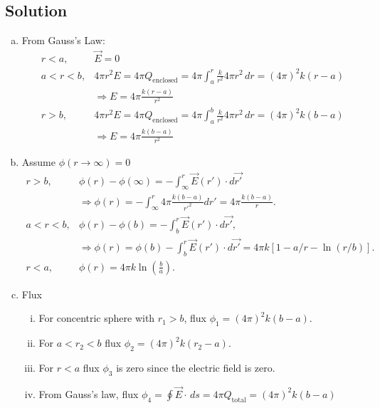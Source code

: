\documentclass[solutions]{esg8022pset}
\begin{document}
\subsection{Solution}
  \begin{enumerate}[(a)]
    \item From Gauss's Law:
      \begin{align*}
        r<a,   & \vec{E}=0\\
        a<r<b, & 4\pi r^2 E = 4\pi Q_{\text{enclosed}} = 4\pi\int_a^r \frac{k}{r^2}4\pi r^2\,dr=(4\pi)^2k(r-a)\\
               & \Rightarrow E = 4\pi \frac{k(r-a)}{r^2}\\
        r>b,   & 4\pi r^2 E = 4\pi Q_{\text{enclosed}} = 4\pi\int_a^b \frac{k}{r^2}4\pi r^2\,dr=(4\pi)^2k(b-a)\\
               & \Rightarrow E= 4\pi \frac{k(b-a)}{r^2}
      \end{align*}

    \item Assume $\phi(r\rightarrow\infty)=0$
      \begin{align*}
        r>b,  &  \phi(r)-\phi(\infty)=-\int_\infty^r \vec{E}(r') \cdot d\vec{r'} \\
              & \Rightarrow \phi(r)=-\int_\infty^r 4\pi \frac{k(b-a)}{r'^2}dr'=4\pi \frac{k(b-a)}{r}.\\
        a<r<b,& \phi(r)-\phi(b)=-\int_b^r\vec{E}(r') \cdot d\vec{r'},\\
              & \Rightarrow \phi(r)= \phi(b)-\int_b^r\vec{E}(r') \cdot d\vec{r'}=4\pi k [1-a/r-\ln (r/b)].\\
        r<a,  & \phi(r)= 4\pi k\ln (\frac{b}{a}).
      \end{align*}

    \item Flux
      \begin{enumerate}[(i)]
        \item For concentric sphere with $r_1>b$, flux $\phi_1=(4\pi)^2k(b-a)$.\\
        \item For $a<r_2<b$ flux $\phi_2=(4\pi)^2k(r_2-a)$.\\
        \item For $r<a$ flux $\phi_3$ is zero since the electric field is zero.\\
        \item From Gauss's law, flux $\phi_4=\oint\vec{E} \cdot\,ds = 4\pi
          Q_{\text{total}} = (4\pi)^2 k(b-a)$
      \end{enumerate}
  \end{enumerate}
\end{document}
